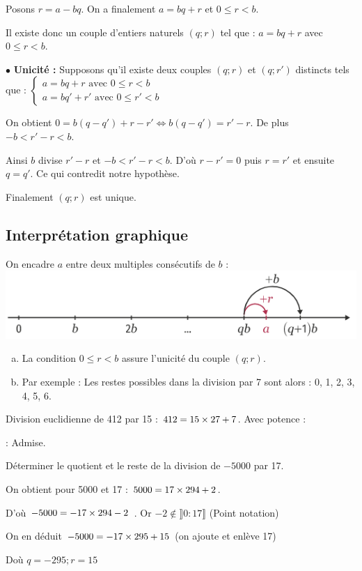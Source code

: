 \documentclass[10pt,a4paper]{article}
\begin{document}
Posons $r=a-bq$. On a finalement $a=bq+r$ et $0 \leq r < b$.

Il existe donc un couple d'entiers naturels $(q ; r)$ tel que : $a = bq + r$ avec $0 \leq r < b$.


$\bullet$ \textbf{Unicité :} Supposons qu'il existe deux couples $(q;r)$ et $(q;r')$ distincts tels que : $\left\lbrace \begin{array}{l} a=bq+r \text{ avec } 0 \leq r <b \\ a=bq'+r' \text{ avec } 0 \leq r' <b \end{array} \right.$

On obtient $0=b(q-q')+r-r' \iff b(q-q')=r'-r$. De plus $-b < r'-r < b$.

Ainsi $b$ divise $r'-r$ et $-b < r'-r < b$. D'où $r-r'=0$ puis $r=r'$ et ensuite $q=q'$. Ce qui contredit notre hypothèse.

Finalement $(q;r)$ est unique.

\subsection*{Interprétation graphique}

On encadre $a$ entre deux multiples consécutifs de $b$ :\includegraphics[width = 0.5 \linewidth,valign=c]{div_eucl_axe}

\rems
\begin{enumerate}[a.]
\item La condition $0 \leq r <b$ assure l'unicité du couple $(q ; r)$.
\item Par exemple : Les restes possibles dans la division par 7 sont alors : 0, 1, 2, 3, 4, 5, 6.

\end{enumerate}

\exe Division euclidienne de 412 par 15 : $412=15 \times 27 + 7$. Avec potence :  





\dem : Admise.

\exe Déterminer le quotient et le reste de la division de $-5000$ par 17.

\begin{minipage}{0.7 \linewidth}
On obtient pour 5000 et 17 : $5000=17 \times 294 +2$.

D'où $-5000 = -17 \times 294 -2$ . Or $-2 \notin \rrbracket 0:17 \rrbracket$ (Point notation)

On en déduit $-5000 = -17 \times 295 + 15$ (on ajoute et enlève 17)

Doù $q=-295 ; r=15$

\end{minipage}
\begin{minipage}{0.25 \linewidth}
\end{minipage}
\end{document}
